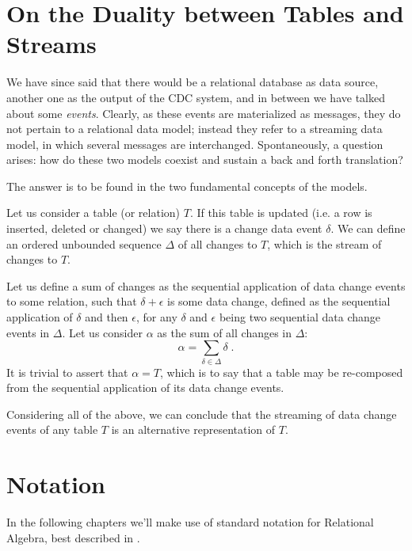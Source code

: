 \section{On the Duality between Tables and Streams}
\label{sec:tables-streams}

We have since said that there would be a relational database as data source, another one as the output of the CDC system, and in between we have talked about some \emph{events}.
Clearly, as these events are materialized as messages, they do not pertain to a relational data model; instead they refer to a streaming data model, in which several messages are interchanged.
Spontaneously, a question arises: how do these two models coexist and sustain a back and forth translation?

The answer is to be found in the two fundamental concepts of the models.

Let us consider a table (or relation) $T$.
If this table is updated (i.e. a row is inserted, deleted or changed) we say there is a change data event $\delta$.
We can define an ordered unbounded sequence $\Delta$ of all changes to $T$, which is the stream of changes to $T$.

Let us define a sum of changes as the sequential application of data change events to some relation, such that $\delta + \epsilon$ is some data change, defined as the sequential application of $\delta$ and then $\epsilon$, for any $\delta$ and $\epsilon$ being two sequential data change events in $\Delta$.
Let us consider $\alpha$ as the sum of all changes in $\Delta$:
$$
\alpha = \sum_{\delta \in \Delta} \delta \; .
$$
It is trivial to assert that $ \alpha = T $, which is to say that a table may be re-composed from the sequential application of its data change events.

Considering all of the above, we can conclude that the streaming of data change events of any table $ T $ is an alternative representation of $ T $.


\section{Notation}

In the following chapters we'll make use of standard notation for Relational Algebra, best described in \cite[Chapter 4]{dbms}.

